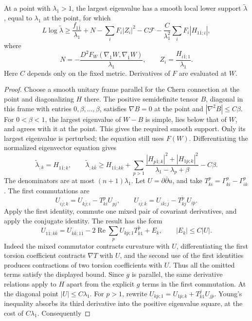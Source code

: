 \begin{lemma}\label{draft:600-hermitian-eigenvalue-inequality}
At a point with $\lambda_1>1$, the largest eigenvalue has a smooth local lower support $\widetilde\lambda$, equal to $\lambda_1$ at the point, for which
\[
 L\log\widetilde\lambda\geq
 \frac{f_{1\bar1}}{\lambda_1}+N
 -\sum_iF_i|Z_i|^2-C\mathcal F
 -\frac{C}{\lambda_1^2}\sum_iF_i|H_{1\bar1;i}|,
\]
where
\[
 N=-\frac{D^2F_W(\nabla_1W,\nabla_{\bar1}W)}{\lambda_1},
 \qquad Z_i=\frac{H_{i\bar1;1}}{\lambda_1}.
\]
Here $C$ depends only on the fixed metric. Derivatives of $F$ are evaluated at $W$.
\end{lemma}
\begin{proof}
Choose a smooth unitary frame parallel for the Chern connection at the point and diagonalizing $H$ there. The positive semidefinite tensor $B$, diagonal in this frame with entries $0,\beta,\ldots,\beta$, satisfies $\nabla B=0$ at the point and $|\nabla^2B|\leq C\beta$. For $0<\beta<1$, the largest eigenvalue of $W-B$ is simple, lies below that of $W$, and agrees with it at the point. This gives the required smooth support. Only its largest eigenvalue is perturbed; the equation still uses $F(W)$.
Differentiating the normalized eigenvector equation gives
\[
 \widetilde\lambda_{;k}=H_{1\bar1;k},\qquad
 \widetilde\lambda_{;k\bar k}\geq H_{1\bar1;k\bar k}
 +\sum_{p>1}\frac{|H_{p\bar1;k}|^2+|H_{1\bar p;k}|^2}
                         {\lambda_1-\lambda_p+\beta}-C\beta.
\]
The denominators are at most $(n+1)\lambda_1$. Let $U=\partial\bar\partial u$, and take $T^p_{ki}=\Gamma^p_{ki}-\Gamma^p_{ik}$. The first commutations are
\[
 U_{i\bar j;k}=U_{k\bar j;i}-T^p_{ki}U_{p\bar j},\qquad
 U_{i\bar j;\bar k}=U_{i\bar k;\bar j}
                          -\overline{T^p_{kj}}U_{i\bar p}.
\]
Apply the first identity, commute one mixed pair of covariant derivatives, and apply the conjugate identity. The result has the form
\[
 U_{1\bar1;k\bar k}=U_{k\bar k;1\bar1}
      -2\operatorname{Re}\sum_p U_{k\bar p;1}\overline{T^p_{k1}}+E_k,
 \qquad |E_k|\leq C|U|.
\]
Indeed the mixed commutator contracts curvature with $U$, differentiating the first torsion coefficient contracts $\nabla T$ with $U$, and the second use of the first identities produces contractions of two torsion coefficients with $U$. Thus all the omitted terms satisfy the displayed bound. Since $g$ is parallel, the same derivative relations apply to $H$ apart from the explicit $g$ terms in the first commutation. At the diagonal point $|U|\leq C\lambda_1$.
For $p>1$, rewrite $U_{k\bar p;1}=U_{1\bar p;k}+T^j_{k1}U_{j\bar p}$. Young's inequality absorbs its third derivative into the positive eigenvalue square, at the cost of $C\lambda_1$. Consequently

\end{proof}
